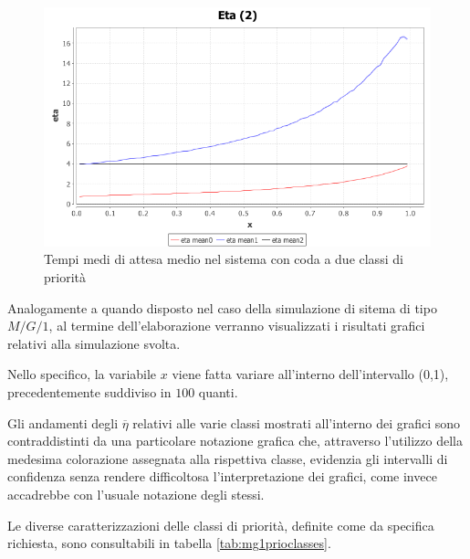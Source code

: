 \begin{figure}[!h]{
	\begin{center}
	   \includegraphics[width=\textwidth]{figures/MG1PRIO[2,mu1,r10000].png}
	\end{center}}
	\caption{Tempi medi di attesa medio nel sistema con coda a due classi di priorit\`a}
	\label{fig:mg1prio2}
\end{figure}

Analogamente a quando disposto nel caso della simulazione di sitema di tipo $M/G/1$, al termine dell'elaborazione verranno visualizzati i risultati grafici relativi alla simulazione svolta.

Nello specifico, la variabile $x$ viene fatta variare all'interno dell'intervallo (0,1), precedentemente suddiviso in $100$ quanti.

Gli andamenti degli $\overline{\eta}$ relativi alle varie classi mostrati all'interno dei grafici sono contraddistinti da una particolare notazione grafica che, attraverso l'utilizzo della medesima colorazione assegnata alla rispettiva classe, evidenzia gli intervalli di confidenza senza rendere difficoltosa l'interpretazione dei grafici, come invece accadrebbe con l'usuale notazione degli stessi.

Le diverse caratterizzazioni delle classi di priorit\`a, definite come da specifica richiesta, sono consultabili in tabella \ref{tab:mg1prioclasses}.


